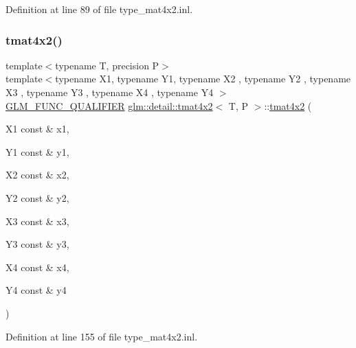 Definition at line 89 of file type\+\_\+mat4x2.\+inl.

\mbox{\label{structglm_1_1detail_1_1tmat4x2_a0c0478eabc7a5766b287d58338d16ea2}} 
\subsubsection{\texorpdfstring{tmat4x2()}{tmat4x2()}\hspace{0.1cm}{\footnotesize\ttfamily [20/22]}}
{\footnotesize\ttfamily template$<$typename T, precision P$>$ \\
template$<$typename X1, typename Y1, typename X2 , typename Y2 , typename X3 , typename Y3 , typename X4 , typename Y4 $>$ \\
\hyperlink{setup_8hpp_a33fdea6f91c5f834105f7415e2a64407}{G\+L\+M\+\_\+\+F\+U\+N\+C\+\_\+\+Q\+U\+A\+L\+I\+F\+I\+ER} \hyperlink{structglm_1_1detail_1_1tmat4x2}{glm\+::detail\+::tmat4x2}$<$ T, P $>$\+::\hyperlink{structglm_1_1detail_1_1tmat4x2}{tmat4x2} (\begin{DoxyParamCaption}\item[{X1 const \&}]{x1,  }\item[{Y1 const \&}]{y1,  }\item[{X2 const \&}]{x2,  }\item[{Y2 const \&}]{y2,  }\item[{X3 const \&}]{x3,  }\item[{Y3 const \&}]{y3,  }\item[{X4 const \&}]{x4,  }\item[{Y4 const \&}]{y4 }\end{DoxyParamCaption})}



Definition at line 155 of file type\+\_\+mat4x2.\+inl.

\mbox{\label{structglm_1_1detail_1_1tmat4x2_a0d9b0f653d1eb4999d09d71bc0e455f7}} 
